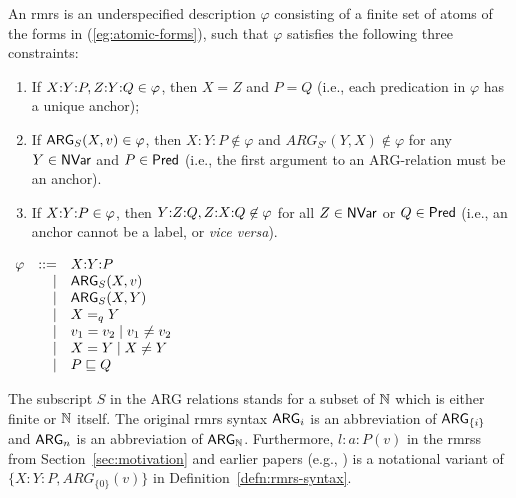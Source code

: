 \begin{definition}\label{defn:rmrs-syntax}
An {\sc rmrs} is an underspecified description $\varphi$ consisting of a
finite set of atoms 
of the forms in (\ref{eg:atomic-forms}), such that $\varphi$
satisfies the
following three constraints:
\begin{enumerate}
\item   If $X {:} Y {:} P, Z {:} Y {:} Q\in \varphi$, then $X=Z$ and $P=Q$
  (i.e., each predication in $\varphi$ has a unique anchor);
\item   If $\mathsf{ARG}_S(X,v)\in \varphi$, then $X:Y:P\not\in \varphi$ and
  $ARG_{S'}(Y,X)\not\in \varphi$ for any $Y\in \mathsf{NVar}$ and
  $P\in \mathsf{Pred}$ (i.e., the first argument to an ARG-relation must be an
  anchor).
\item   If $X {:} Y {:} P\in \varphi$, then $Y {:} Z {:} Q,
  Z {:} X {:} Q\not\in \varphi$ for all 
  $Z\in \mathsf{NVar}$ or $Q\in \mathsf{Pred}$ (i.e., an anchor cannot be a label, or
  {\em vice versa}).
\end{enumerate}
\begin{examples}
\item   \label{eg:atomic-forms}
$\begin{array}{rrll}
\varphi &::= &\ep{X}{Y}{P} \\ %
&| &\ARG_S(X,v) \\ %
&| &\ARG_S(X,Y) \\ %
&| &X \qeq Y \\ %
&| &v_1 = v_2 \;|\; v_1 \neq v_2 \\ %
&| &X = Y \;|\; X \neq Y \\ %
&| &P \spec Q %
\end{array}
$
\end{examples}
\end{definition}

The subscript $S$ in the ARG relations stands for a subset of $\mathbb{N}$ which
is either finite or $\mathbb{N}$ 
itself.  The original {\sc rmrs} syntax $\mathsf{ARG}_i$ is 
an abbreviation of $\mathsf{ARG}_{\{i\}}$ and $\mathsf{ARG}_n$ is an abbreviation of
$\mathsf{ARG}_{\mathbb{N}}$.  Furthermore, $l:a:P(v)$ in the {\sc rmrs}s from
Section~\ref{sec:motivation} and earlier papers (e.g.,
\cite{copestake:2003}) 
is a notational variant of $\{X:Y:P, ARG_{\{0\}}(v)\}$ in
Definition~\ref{defn:rmrs-syntax}.  

